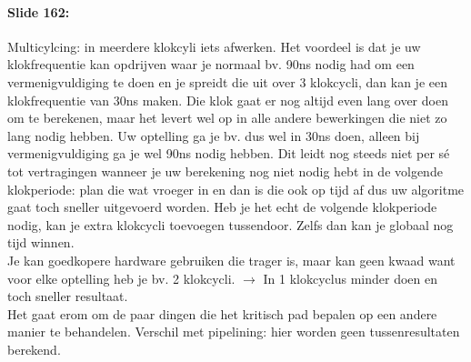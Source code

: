 \documentclass[10pt,a4paper]{book}
\begin{document}
\paragraph{Slide 162:} Multicylcing: in meerdere klokcyli iets afwerken. Het voordeel is dat je uw klokfrequentie kan opdrijven waar je normaal bv. 90ns nodig had om een vermenigvuldiging te doen en je spreidt die uit over 3 klokcycli, dan kan je een klokfrequentie van 30ns maken. Die klok gaat er nog altijd even lang over doen om te berekenen, maar het levert wel op in alle andere bewerkingen die niet zo lang nodig hebben. Uw optelling ga je bv. dus wel in 30ns doen, alleen bij vermenigvuldiging ga je wel 90ns nodig hebben. Dit leidt nog steeds niet per s\'e tot vertragingen wanneer je uw berekening nog niet nodig hebt in de volgende klokperiode: plan die wat vroeger in en dan is die ook op tijd af dus uw algoritme gaat toch sneller uitgevoerd worden. Heb je het echt de volgende klokperiode nodig, kan je extra klokcycli toevoegen tussendoor. Zelfs dan kan je globaal nog tijd winnen.\\
Je kan goedkopere hardware gebruiken die trager is, maar kan geen kwaad want voor elke optelling heb je bv. 2 klokcycli. $\rightarrow$ In 1 klokcyclus minder doen en toch sneller resultaat.\\
Het gaat erom om de paar dingen die het kritisch pad bepalen op een andere manier te behandelen.
Verschil met pipelining: hier worden geen tussenresultaten berekend. 
\end{document}
